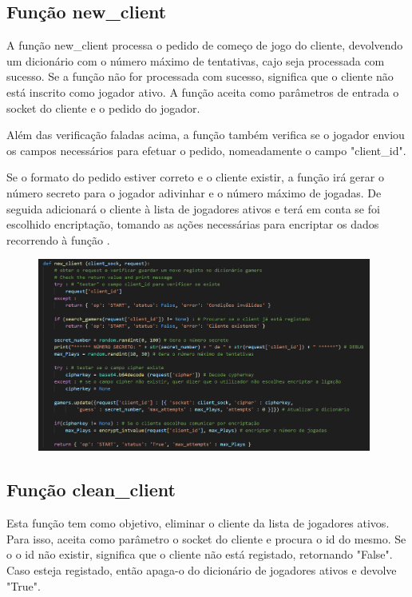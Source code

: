 \documentclass{report}
\begin{document}
\subsection{Função new\_client}
\label{ssec:func_new_client}

A função new\_client processa o pedido de começo de jogo do cliente, devolvendo um dicionário com o número máximo de tentativas, cajo seja processada com sucesso. Se a função não for processada com sucesso, significa que o cliente não está inscrito como jogador ativo. A função aceita como parâmetros de entrada o socket do cliente e o pedido do jogador.

Além das verificação faladas acima, a função também verifica se o jogador enviou os campos necessários para efetuar o pedido, nomeadamente o campo "client\_id".

Se o formato do pedido estiver correto e o cliente existir, a função irá gerar o número secreto para o jogador adivinhar e o número máximo de jogadas. De seguida adicionará o cliente à lista de jogadores ativos e terá em conta se foi escolhido encriptação, tomando as ações necessárias para encriptar os dados recorrendo à função  .

\begin{figure}[!h]
\center
\includegraphics[height = 180pt]{img/newclient.png}
\end{figure}

\subsection{Função clean\_client}
\label{ssec:func_clean_client}

Esta função tem como objetivo, eliminar o cliente da lista de jogadores ativos. Para isso, aceita como parâmetro o socket do cliente e procura o id do mesmo. Se o o id não existir, significa que o cliente não está registado, retornando "False". Caso esteja registado, então apaga-o do dicionário de jogadores ativos e devolve "True".
\end{document}
